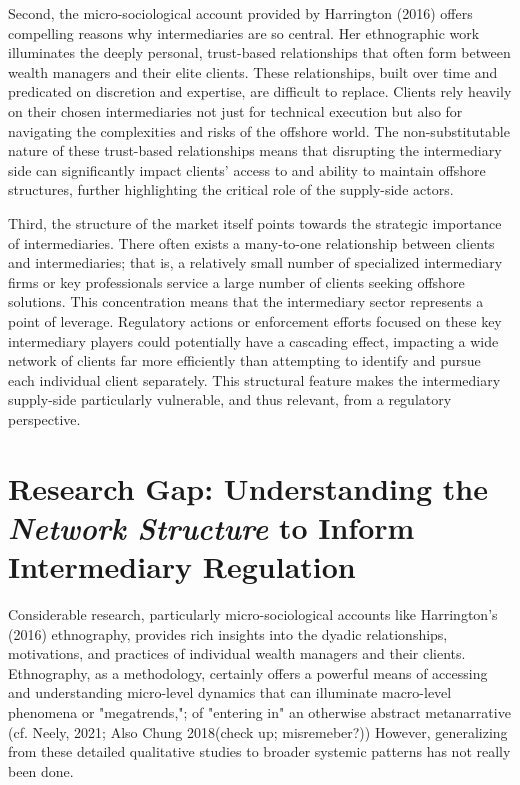 Second, the micro-sociological account provided by Harrington (2016) offers compelling reasons why intermediaries are so central. Her ethnographic work illuminates the deeply personal, trust-based relationships that often form between wealth managers and their elite clients. These relationships, built over time and predicated on discretion and expertise, are difficult to replace. Clients rely heavily on their chosen intermediaries not just for technical execution but also for navigating the complexities and risks of the offshore world. The non-substitutable nature of these trust-based relationships means that disrupting the intermediary side can significantly impact clients' access to and ability to maintain offshore structures, further highlighting the critical role of the supply-side actors.

Third, the structure of the market itself points towards the strategic importance of intermediaries. There often exists a many-to-one relationship between clients and intermediaries; that is, a relatively small number of specialized intermediary firms or key professionals service a large number of clients seeking offshore solutions. This concentration means that the intermediary sector represents a point of leverage. Regulatory actions or enforcement efforts focused on these key intermediary players could potentially have a cascading effect, impacting a wide network of clients far more efficiently than attempting to identify and pursue each individual client separately. This structural feature makes the intermediary supply-side particularly vulnerable, and thus relevant, from a regulatory perspective.


\section{Research Gap: Understanding the \textit{Network Structure} to Inform Intermediary Regulation}
\label{sec:1_4}

Considerable research, particularly micro-sociological accounts like Harrington's (2016) ethnography, provides rich insights into the dyadic relationships, motivations, and practices of individual wealth managers and their clients. Ethnography, as a methodology, certainly offers a powerful means of accessing and understanding micro-level dynamics that can illuminate macro-level phenomena or "megatrends,"; of "entering in" an otherwise abstract metanarrative (cf. Neely, 2021; Also Chung 2018(check up; misremeber?)) However, generalizing from these detailed qualitative studies to broader systemic patterns has not really been done.

